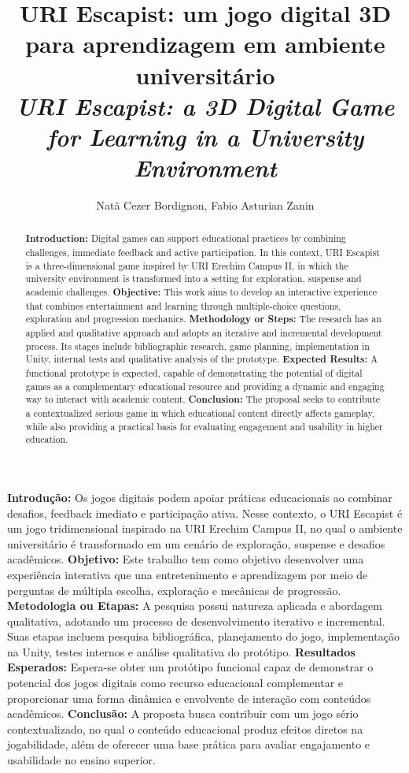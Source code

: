 \documentclass[12pt]{article}
\title{URI Escapist: um jogo digital 3D para aprendizagem em ambiente universitário \\
\medskip
\small{
    \textit{URI Escapist: a 3D Digital Game for Learning in a University Environment}
}
}
\author{Natã Cezer Bordignon\inst{1}, Fabio Asturian Zanin\inst{1}}
\begin{document}
\maketitle

\thispagestyle{plain}
\pagestyle{plain2}

\begin{abstract}
\textbf{Introduction:} Digital games can support educational practices by combining challenges, immediate feedback and active participation. In this context, URI Escapist is a three-dimensional game inspired by URI Erechim Campus II, in which the university environment is transformed into a setting for exploration, suspense and academic challenges.
\textbf{Objective:} This work aims to develop an interactive experience that combines entertainment and learning through multiple-choice questions, exploration and progression mechanics.
\textbf{Methodology or Steps:} The research has an applied and qualitative approach and adopts an iterative and incremental development process. Its stages include bibliographic research, game planning, implementation in Unity, internal tests and qualitative analysis of the prototype.
\textbf{Expected Results:} A functional prototype is expected, capable of demonstrating the potential of digital games as a complementary educational resource and providing a dynamic and engaging way to interact with academic content.
\textbf{Conclusion:} The proposal seeks to contribute a contextualized serious game in which educational content directly affects gameplay, while also providing a practical basis for evaluating engagement and usability in higher education.
\end{abstract}


\begin{resumo}
\textbf{Introdução:} Os jogos digitais podem apoiar práticas educacionais ao combinar desafios, feedback imediato e participação ativa. Nesse contexto, o URI Escapist é um jogo tridimensional inspirado na URI Erechim Campus II, no qual o ambiente universitário é transformado em um cenário de exploração, suspense e desafios acadêmicos.
\textbf{Objetivo:} Este trabalho tem como objetivo desenvolver uma experiência interativa que una entretenimento e aprendizagem por meio de perguntas de múltipla escolha, exploração e mecânicas de progressão.
\textbf{Metodologia ou Etapas:} A pesquisa possui natureza aplicada e abordagem qualitativa, adotando um processo de desenvolvimento iterativo e incremental. Suas etapas incluem pesquisa bibliográfica, planejamento do jogo, implementação na Unity, testes internos e análise qualitativa do protótipo.
\textbf{Resultados Esperados:} Espera-se obter um protótipo funcional capaz de demonstrar o potencial dos jogos digitais como recurso educacional complementar e proporcionar uma forma dinâmica e envolvente de interação com conteúdos acadêmicos.
\textbf{Conclusão:} A proposta busca contribuir com um jogo sério contextualizado, no qual o conteúdo educacional produz efeitos diretos na jogabilidade, além de oferecer uma base prática para avaliar engajamento e usabilidade no ensino superior.
\end{resumo}
\end{document}
